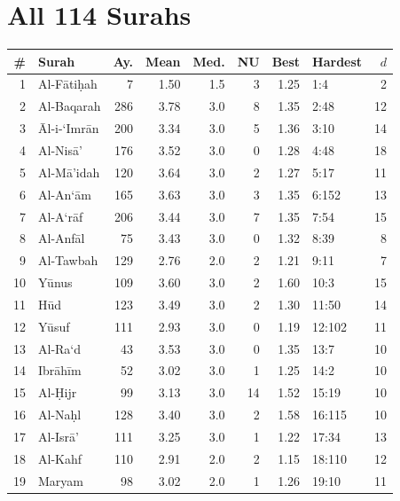 \documentclass[11pt,a4paper]{article}
\begin{document}
\section{All 114 Surahs}
\label{app:surah_table}

\begin{table}[h]
\centering
\scriptsize
\setlength{\tabcolsep}{2pt}
\begin{minipage}[t]{0.48\textwidth}
\centering
\begin{tabular}{rl r r r r r lr}
\toprule
\textbf{\#} & \textbf{Surah} & \textbf{Ay.} & \textbf{Mean} & \textbf{Med.} & \textbf{NU} & \textbf{Best} & \textbf{Hardest} & \textbf{$d$} \\
\midrule
1 & Al-F\=ati\d{h}ah & 7 & 1.50 & 1.5 & 3 & 1.25 & 1:4 & 2 \\
2 & Al-Baqarah & 286 & 3.78 & 3.0 & 8 & 1.35 & 2:48 & 12 \\
3 & \=Al-i-`Imr\=an & 200 & 3.34 & 3.0 & 5 & 1.36 & 3:10 & 14 \\
4 & Al-Nis\=a' & 176 & 3.52 & 3.0 & 0 & 1.28 & 4:48 & 18 \\
5 & Al-M\=a'idah & 120 & 3.64 & 3.0 & 2 & 1.27 & 5:17 & 11 \\
6 & Al-An`\=am & 165 & 3.63 & 3.0 & 3 & 1.35 & 6:152 & 13 \\
7 & Al-A`r\=af & 206 & 3.44 & 3.0 & 7 & 1.35 & 7:54 & 15 \\
8 & Al-Anf\=al & 75 & 3.43 & 3.0 & 0 & 1.32 & 8:39 & 8 \\
9 & Al-Tawbah & 129 & 2.76 & 2.0 & 2 & 1.21 & 9:11 & 7 \\
10 & Y\=unus & 109 & 3.60 & 3.0 & 2 & 1.60 & 10:3 & 15 \\
11 & H\=ud & 123 & 3.49 & 3.0 & 2 & 1.30 & 11:50 & 14 \\
12 & Y\=usuf & 111 & 2.93 & 3.0 & 0 & 1.19 & 12:102 & 11 \\
13 & Al-Ra`d & 43 & 3.53 & 3.0 & 0 & 1.35 & 13:7 & 10 \\
14 & Ibr\=ah\=im & 52 & 3.02 & 3.0 & 1 & 1.25 & 14:2 & 10 \\
15 & Al-\d{H}ijr & 99 & 3.13 & 3.0 & 14 & 1.52 & 15:19 & 10 \\
16 & Al-Na\d{h}l & 128 & 3.40 & 3.0 & 2 & 1.58 & 16:115 & 10 \\
17 & Al-Isr\=a' & 111 & 3.25 & 3.0 & 1 & 1.22 & 17:34 & 13 \\
18 & Al-Kahf & 110 & 2.91 & 2.0 & 2 & 1.15 & 18:110 & 12 \\
19 & Maryam & 98 & 3.02 & 2.0 & 1 & 1.26 & 19:10 & 11 \\

\end{tabular}
\end{minipage}
\end{table}
\end{document}

